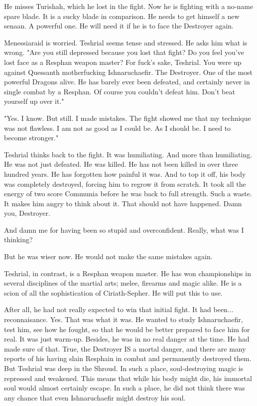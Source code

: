 He misses Turishah, which he lost in the fight. 
Now he is fighting with a no-name spare blade. 
It is a sucky blade in comparison. 
He needs to get himself a new senaan. 
A powerful one. 
He will need it if he is to face the Destroyer again. 

\begin{comment}
\subsection{Worrying}
\end{comment}

Menessiaraid is worried. 
Teshrial seems tense and stressed. 
He asks him what is wrong. 
"Are you still depressed because you lost that fight? 
 Do you feel you've lost face as a Resphan weapon master?
 For fuck's sake, Teshrial.
 You were up against Quessanth motherfucking Ishnaruchaefir. 
 The Destroyer. 
 One of the most powerful Dragons alive. 
 He has barely ever been defeated, and certainly never in single combat by a Resphan. 
 Of course you couldn't defeat him. 
 Don't beat yourself up over it."

"Yes. I know. 
 But still.
 I made mistakes. 
 The fight showed me that my technique was not flawless. 
 I am not as good as I could be. 
 As I should be. 
 I need to become stronger."

Teshrial thinks back to the fight. 
It was humiliating.
And more than humiliating. 
He was not just defeated. 
He was killed. 
He has not been killed in over three hundred years. 
He has forgotten how painful it was. 
And to top it off, his body was completely destroyed, forcing him to regrow it from scratch. 
It took all the energy of two score Communia before he was back to full strength. 
Such a waste. 
It makes him angry to think about it. 
That should not have happened. 
Damn you, Destroyer. 

And damn me for having been so stupid and overconfident. 
Really, what was I thinking?

But he was wiser now. 
He would not make the same mistakes again. 

Teshrial, in contrast, is a Resphan weapon master. 
He has won championships in several disciplines of the martial arts; melee, firearms and magic alike. 
He is a scion of all the sophistication of Ciriath-Sepher. 
He will put this to use. 

After all, he had not really expected to win that initial fight. 
It had been... reconnaisance. 
Yes. 
That was what it was. 
He wanted to study Ishnaruchaefir, test him, see how he fought, so that he would be better prepared to face him for real. 
It was just warm-up. 
Besides, he was in no real danger at the time. 
He had made sure of that. 
True, the Destroyer IS a mortal danger, and there are many reports of his having slain Resphain in combat and permanently destroyed them. 
But Teshrial was deep in the Shroud. 
In such a place, soul-destroying magic is repressed and weakened. 
This means that while his body might die, his immortal soul would almost certainly escape. 
In such a place, he did not think there was any chance that even Ishnaruchaefir might destroy his soul. 

